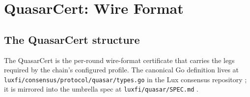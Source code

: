 \section{QuasarCert: Wire Format}
\label{sec:wire}

\subsection{The QuasarCert structure}

The QuasarCert is the per-round wire-format certificate that carries
the legs required by the chain's configured profile. The canonical Go
definition lives at \texttt{luxfi/consensus/protocol/quasar/types.go}
in the Lux consensus repository \cite{consensusrepo}; it is mirrored
into the umbrella spec at \texttt{luxfi/quasar/SPEC.md}
\cite{quasarrepo}.


